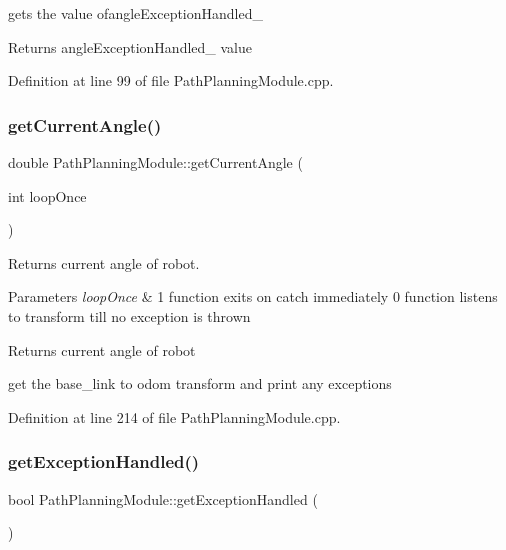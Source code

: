 gets the value ofangle\+Exception\+Handled\+\_\+ 

\begin{DoxyReturn}{Returns}
angle\+Exception\+Handled\+\_\+ value 
\end{DoxyReturn}


Definition at line 99 of file Path\+Planning\+Module.\+cpp.

\mbox{\label{class_path_planning_module_ad849d7f34033bd02d65fb377cdb0c9c7}} 
\subsubsection{\texorpdfstring{get\+Current\+Angle()}{getCurrentAngle()}}
{\footnotesize\ttfamily double Path\+Planning\+Module\+::get\+Current\+Angle (\begin{DoxyParamCaption}\item[{int}]{loop\+Once }\end{DoxyParamCaption})}



Returns current angle of robot. 


\begin{DoxyParams}{Parameters}
{\em loop\+Once} & 1 function exits on catch immediately 0 function listens to transform till no exception is thrown\\
\hline
\end{DoxyParams}
\begin{DoxyReturn}{Returns}
current angle of robot 
\end{DoxyReturn}
get the base\+\_\+link to odom transform and print any exceptions 

Definition at line 214 of file Path\+Planning\+Module.\+cpp.

\mbox{\label{class_path_planning_module_a88726f5b5c4919595c0027b8ea4776c3}} 
\subsubsection{\texorpdfstring{get\+Exception\+Handled()}{getExceptionHandled()}}
{\footnotesize\ttfamily bool Path\+Planning\+Module\+::get\+Exception\+Handled (\begin{DoxyParamCaption}{ }\end{DoxyParamCaption})}




